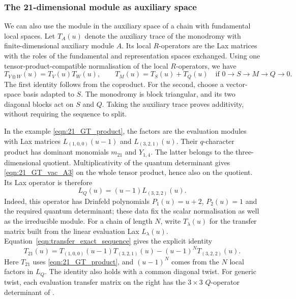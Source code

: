 \documentclass[12pt,reqno]{amsart}
\numberwithin{equation}{section}
\begin{document}
\subsubsection{The 21-dimensional module as auxiliary space}
We can also use the module in the auxiliary space of a chain with
fundamental local spaces. Let $T_A(u)$ denote the auxiliary trace
of the monodromy with finite-dimensional auxiliary module $A$.
Its local $R$-operators are the Lax matrices with the roles of
the fundamental and representation spaces exchanged. Using one
tensor-product-compatible normalisation of the local $R$-operators,
we have
\begin{equation}
    T_{V\otimes W}(u)=T_V(u)T_W(u),\qquad
    T_M(u)=T_S(u)+T_Q(u)
    \quad\text{if }0\to S\to M\to Q\to0.
    \label{eqn:transfer_exact_sequence}
\end{equation}
The first identity follows from the coproduct. For the second,
choose a vector-space basis adapted to $S$. The monodromy is
block triangular, and its two diagonal blocks act on $S$ and $Q$.
Taking the auxiliary trace proves additivity, without requiring
the sequence to split.

In the example \eqref{eqn:21_GT_product}, the factors are the
evaluation modules with Lax matrices $L_{(1,0,0)}(u-1)$ and
$L_{(3,2,1)}(u)$. Their $q$-character product has dominant
monomials $m_{21}$ and $Y_{1,4}$. The latter belongs to the
three-dimensional quotient. Multiplicativity of the quantum
determinant gives \eqref{eqn:21_GT_vac_A3} on the whole tensor
product, hence also on the quotient. Its Lax operator is therefore
\begin{equation*}
    L_Q(u)=(u-1)L_{(3,2,2)}(u).
\end{equation*}
Indeed, this operator has Drinfeld polynomials $P_1(u)=u+2$,
$P_2(u)=1$ and the required quantum determinant; these data fix
the scalar normalisation as well as the irreducible module.
For a chain of length $N$, write $T_\lambda(u)$ for the transfer
matrix built from the linear evaluation Lax $L_\lambda(u)$.
Equation~\eqref{eqn:transfer_exact_sequence} gives the explicit identity
\begin{equation}
    T_{21}(u)=T_{(1,0,0)}(u-1)T_{(3,2,1)}(u)
       -(u-1)^N T_{(3,2,2)}(u).
    \label{eqn:21_transfer_fusion}
\end{equation}
Here $T_{21}$ uses \eqref{eqn:21_GT_product}, and $(u-1)^N$
comes from the $N$ local factors in $L_Q$. The identity also
holds with a common diagonal twist. For generic twist, each
evaluation transfer matrix on the right has the $3\times3$
$Q$-operator determinant of \cite[Eq.~(5.10)]{BFLMS}.
\end{document}
